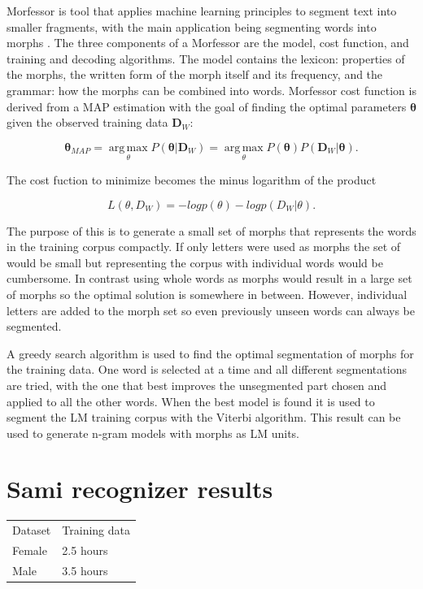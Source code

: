 \documentclass[b5paper]{article}
\begin{document}
Morfessor is tool that applies machine learning principles to segment text into smaller fragments, with the main application being segmenting words into morphs \cite{creutz2007unsupervised}. The three components of a Morfessor are the model, cost function, and training and decoding algorithms. The model contains the lexicon: properties of the morphs, the written form of the morph itself and its frequency, and the grammar: how the morphs can be combined into words. Morfessor cost function is derived from a MAP estimation with the goal of finding the optimal parameters $\bm{\theta}$ given the observed training data $\bm{D}_W$:

\begin{equation}
\bm{\theta}_{MAP}=\operatorname*{arg\,max}_{\theta}P(\bm{\theta}|\bm{D}_W)=\operatorname*{arg\,max}_{\theta}P(\bm{\theta})P(\bm{D}_W|\bm{\theta}).
\end{equation}

The cost fuction to minimize becomes the minus logarithm of the product

\begin{equation}
L(\theta, D_W)=-log p(\theta)-log p(D_W|\theta).
\end{equation}

The purpose of this is to generate a small set of morphs that represents the words in the training corpus compactly. If only letters were used as morphs the set of would be small but representing the corpus with individual words would be cumbersome. In contrast using whole words as morphs would result in a large set of morphs so the optimal solution is somewhere in between. However, individual letters are added to the morph set so even previously unseen words can always be segmented.

A greedy search algorithm is used to find the optimal segmentation of morphs for the training data. One word is selected at a time and all different segmentations are tried, with the one that best improves the unsegmented part chosen and applied to all the other words. When the best model is found it is used to segment the LM training corpus with the Viterbi algorithm. This result can be used to generate n-gram models with morphs as LM units.

\section{Sami recognizer results} 
\begin{table}[h!]
\begin{tabular}{ll}
Dataset & Training data\\
Female & 2.5 hours\\
Male & 3.5 hours\\
\end{tabular}
\end{table}
\end{document}
